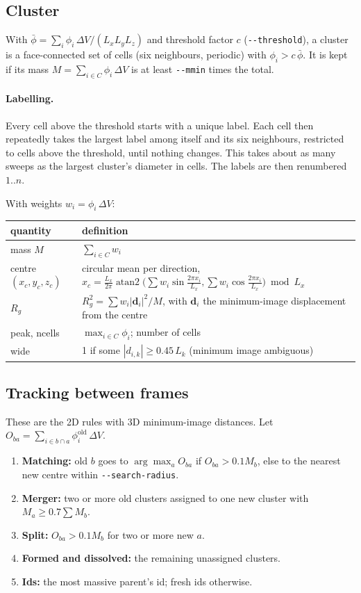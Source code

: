 \documentclass[11pt]{article}
\newcommand{\code}[1]{\texttt{#1}}
\begin{document}
\subsection{Cluster}
With $\bar\phi=\sum_i\phi_i\,\Delta V/(L_xL_yL_z)$ and threshold factor $c$
(\code{-{}-threshold}), a cluster is a face-connected set of cells (six
neighbours, periodic) with $\phi_i>c\,\bar\phi$. It is kept if its mass
$M=\sum_{i\in C}\phi_i\,\Delta V$ is at least \code{-{}-mmin} times the total.

\paragraph{Labelling.} Every cell above the threshold starts with a unique
label. Each cell then repeatedly takes the largest label among itself and its
six neighbours, restricted to cells above the threshold, until nothing
changes. This takes about as many sweeps as the largest cluster's diameter in
cells. The labels are then renumbered $1..n$.

With weights $w_i=\phi_i\,\Delta V$:
\begin{center}
\begin{tabularx}{\textwidth}{@{}lL@{}}
\toprule
quantity & definition \\
\midrule
mass $M$ & $\sum_{i\in C}w_i$ \\
centre $(x_c,y_c,z_c)$ & circular mean per direction,
  $x_c=\frac{L_x}{2\pi}\operatorname{atan2}\bigl(\sum w_i\sin\frac{2\pi x_i}{L_x},\sum w_i\cos\frac{2\pi x_i}{L_x}\bigr)\bmod L_x$ \\
$R_g$ & $R_g^2=\sum w_i|\mathbf d_i|^2/M$, with $\mathbf d_i$ the minimum-image displacement from the centre \\
peak, ncells & $\max_{i\in C}\phi_i$; number of cells \\
wide & 1 if some $|d_{i,k}|\ge0.45\,L_k$ (minimum image ambiguous) \\
\bottomrule
\end{tabularx}
\end{center}

\subsection{Tracking between frames}
These are the 2D rules with 3D minimum-image distances. Let
$O_{ba}=\sum_{i\in b\cap a}\phi^{\mathrm{old}}_i\,\Delta V$.
\begin{enumerate}[nosep]
  \item \textbf{Matching:} old $b$ goes to $\arg\max_aO_{ba}$ if
        $O_{ba}>0.1M_b$, else to the nearest new centre within
        \code{-{}-search-radius}.
  \item \textbf{Merger:} two or more old clusters assigned to one new cluster
        with $M_a\ge0.7\sum M_b$.
  \item \textbf{Split:} $O_{ba}>0.1M_b$ for two or more new $a$.
  \item \textbf{Formed and dissolved:} the remaining unassigned clusters.
  \item \textbf{Ids:} the most massive parent's id; fresh ids otherwise.
\end{enumerate}
\end{document}
